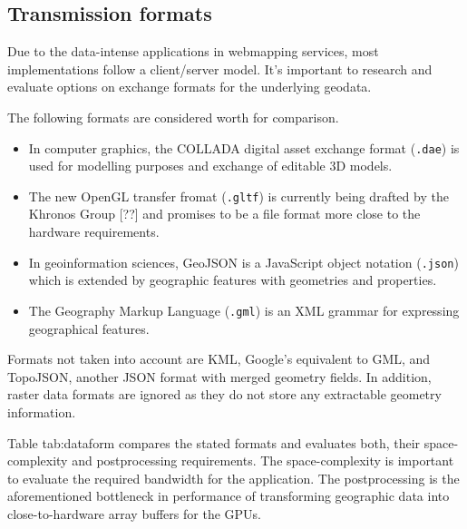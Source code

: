     \subsection{Transmission formats}
      Due to the data-intense applications in webmapping services, most implementations follow a client/server model. It's important to research and evaluate options on exchange formats for the underlying geodata.\par
      The following formats are considered worth for comparison.
      \begin{itemize}
      \item In computer graphics, the COLLADA digital asset exchange format (\texttt{.dae}) is used for modelling purposes and exchange of editable 3D models.
      \item The new OpenGL transfer fromat (\texttt{.gltf}) is currently being drafted by the Khronos Group [??] and promises to be a file format more close to the hardware requirements.
      \item In geoinformation sciences, GeoJSON is a JavaScript object notation (\texttt{.json}) which is extended by geographic features with geometries and properties.
      \item The Geography Markup Language (\texttt{.gml}) is an XML grammar for expressing geographical features.
      \end{itemize}
      Formats not taken into account are KML, Google's equivalent to GML, and TopoJSON, another JSON format with merged geometry fields. In addition, raster data formats are ignored as they do not store any extractable geometry information.\par
      Table {tab:dataform} compares the stated formats and evaluates both, their space-complexity and postprocessing requirements. The space-complexity is important to evaluate the required bandwidth for the application. The postprocessing is the aforementioned bottleneck in performance of transforming geographic data into close-to-hardware array buffers for the GPUs.\par

